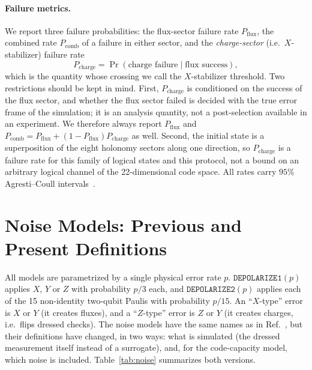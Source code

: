 \documentclass[a4paper]{article}
\begin{document}
\paragraph{Failure metrics.}
We report three failure probabilities: the flux-sector failure rate $P_{\mathrm{flux}}$, the combined rate $P_{\mathrm{comb}}$ of a failure in either sector, and the \emph{charge-sector} (i.e.\ $X$-stabilizer) failure rate
\begin{equation}
  P_{\mathrm{charge}}=\Pr(\text{charge failure}\mid\text{flux success}),
\end{equation}
which is the quantity whose crossing we call the $X$-stabilizer threshold. Two restrictions should be kept in mind. First, $P_{\mathrm{charge}}$ is conditioned on the success of the flux sector, and whether the flux sector failed is decided with the true error frame of the simulation; it is an analysis quantity, not a post-selection available in an experiment. We therefore always report $P_{\mathrm{flux}}$ and $P_{\mathrm{comb}}=P_{\mathrm{flux}}+(1-P_{\mathrm{flux}})P_{\mathrm{charge}}$ as well. Second, the initial state is a superposition of the eight holonomy sectors along one direction, so $P_{\mathrm{charge}}$ is a failure rate for this family of logical states and this protocol, not a bound on an arbitrary logical channel of the 22-dimensional code space. All rates carry $95\%$ Agresti--Coull intervals~\cite{agresti1998}.

\section{Noise Models: Previous and Present Definitions}
\label{sec:noise}

All models are parametrized by a single physical error rate $p$. $\mathtt{DEPOLARIZE1}(p)$ applies $X$, $Y$ or $Z$ with probability $p/3$ each, and $\mathtt{DEPOLARIZE2}(p)$ applies each of the 15 non-identity two-qubit Paulis with probability $p/15$. An ``$X$-type'' error is $X$ or $Y$ (it creates fluxes), and a ``$Z$-type'' error is $Z$ or $Y$ (it creates charges, i.e.\ flips dressed checks). The noise models have the same names as in Ref.~\cite{haga2026aqis}, but their definitions have changed, in two ways: what is simulated (the dressed measurement itself instead of a surrogate), and, for the code-capacity model, which noise is included. Table~\ref{tab:noise} summarizes both versions.
\end{document}
